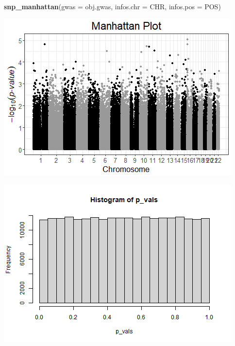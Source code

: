 \documentclass[
]{article}
\newenvironment{Shaded}{\begin{snugshade}}{\end{snugshade}}
\newcommand{\CommentTok}[1]{\textcolor[rgb]{0.56,0.35,0.01}{\textit{#1}}}
\newcommand{\DataTypeTok}[1]{\textcolor[rgb]{0.13,0.29,0.53}{#1}}
\newcommand{\DecValTok}[1]{\textcolor[rgb]{0.00,0.00,0.81}{#1}}
\newcommand{\KeywordTok}[1]{\textcolor[rgb]{0.13,0.29,0.53}{\textbf{#1}}}
\newcommand{\NormalTok}[1]{#1}
\newcommand{\OperatorTok}[1]{\textcolor[rgb]{0.81,0.36,0.00}{\textbf{#1}}}
\newcommand{\StringTok}[1]{\textcolor[rgb]{0.31,0.60,0.02}{#1}}
\begin{document}
\begin{Shaded}
\begin{Highlighting}[]
\KeywordTok{snp_manhattan}\NormalTok{(}\DataTypeTok{gwas =}\NormalTok{ obj.gwas, }\DataTypeTok{infos.chr =}\NormalTok{ CHR, }\DataTypeTok{infos.pos =}\NormalTok{ POS)}
\end{Highlighting}
\end{Shaded}

\includegraphics{stats-gene-research-progress-v9_files/figure-latex/unnamed-chunk-2-2.png}

\begin{Shaded}
\end{Shaded}

\includegraphics{stats-gene-research-progress-v9_files/figure-latex/unnamed-chunk-2-3.png}
\end{document}
